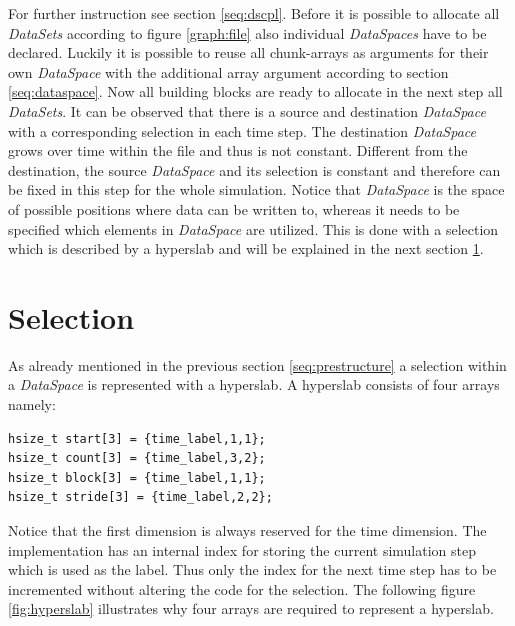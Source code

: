 For further instruction see section \ref{seq:dscpl}. Before it is possible to allocate all \textit{DataSets} according to figure \ref{graph:file} also individual \textit{DataSpaces} have to be declared. Luckily it is possible to reuse all chunk-arrays as arguments for their own \textit{DataSpace} with the additional array argument according to section \ref{seq:dataspace}. Now all building blocks are ready to allocate in the next step all \textit{DataSets}. It can be observed that there is a source and destination \textit{DataSpace} with a corresponding selection in each time step. The destination \textit{DataSpace} grows over time within the file and thus is not constant. Different from the destination, the source \textit{DataSpace} and its selection is constant and therefore can be fixed in this step for the whole simulation. Notice that \textit{DataSpace} is the space of possible positions where data can be written to, whereas it needs to be specified which elements in \textit{DataSpace} are utilized. This is done with a selection which is described by a hyperslab and will be explained in the next section \ref{seq:selection}.

\section{Selection}
\label{seq:selection}
As already mentioned in the previous section \ref{seq:prestructure} a selection within a \textit{DataSpace} is represented with a hyperslab. A hyperslab consists of four arrays namely:
\begin{lstlisting}
hsize_t start[3] = {time_label,1,1};
hsize_t count[3] = {time_label,3,2};
hsize_t block[3] = {time_label,1,1};
hsize_t stride[3] = {time_label,2,2};
\end{lstlisting}
Notice that the first dimension is always reserved for the time dimension. The implementation has an internal index for storing the current simulation step which is used as the label. Thus only the index for the next time step has to be incremented without altering the code for the selection. The following figure \ref{fig:hyperslab} illustrates why four arrays are required to represent a hyperslab.

